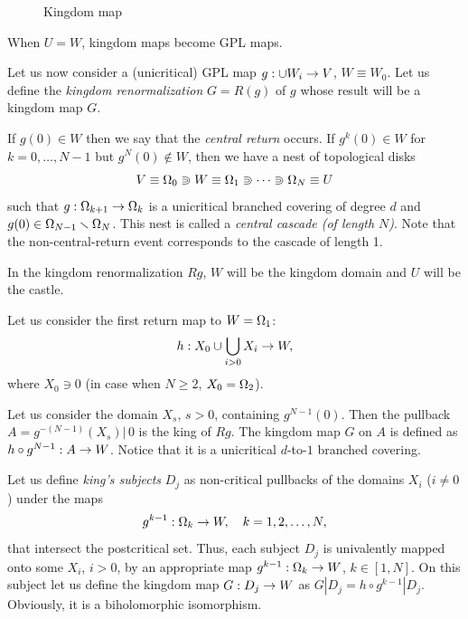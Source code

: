 \begin{figure}[htbp]
\begin{center}

\caption{Kingdom map}
\end{center}
\end{figure}



When $U=W$, kingdom maps become GPL maps.

\msk
Let us now consider a (unicritical)  GPL map $g: \cup W_i\rightarrow V$, $W\equiv W_0$. 
Let us define  the {\it kingdom renormalization} $G=R(g)$ of $g$
whose result will be a kingdom map $G$. 

 
 If $g(0)\in W$ then we say that the {\it central return} occurs.
If $g^k (0)\in W$ for $k=0, \dots, N-1$ but $g^N(0)\not\in W$, 
then we have a nest of topological disks
\begin{equation}\label{cascade}
    V\equiv {\Omega}_0\Supset W\equiv  {\Omega}_1\Supset\dots \Supset {\Omega}_N\equiv U
\end{equation}
such that $g: {\Omega}_{k+1}\rightarrow {\Omega}_k$ is a unicritical branched covering of degree $d$ 
and $g(0)\in {\Omega}_{N-1}\smallsetminus {\Omega}_N$.   
This nest is called a {\it central cascade (of length $N$)}. 
Note that the non-central-return event corresponds to the cascade of length 1. 

In  the kingdom renormalization $Rg$,  $W$ will be the kingdom domain and $U$ will be the  castle.

Let us consider the first return map to $W={\Omega}_1$:
$$
   h : X_0 \cup \bigcup_{i>0} X_i  \rightarrow W, 
$$
where $X_0\ni 0$ (in case when $N\geq 2$, $X_0= {\Omega}_2$). 

Let us consider the domain $X_s$, $s>0$,  containing  $g^{N-1}(0)$. 
Then  the pullback $A  = g^{-(N-1)}(X_s)|\, 0$ is the  king of $Rg$.  
The kingdom map $G$ on $A$ is defined as $ h \circ g^{N-1}: A \rightarrow W$.
Notice that it is a unicritical $d$-to-$1$ branched covering. 

Let us define {\it king's subjects} $D_j$ as non-critical pullbacks of the domains $X_i$ ($i\not= 0$) under the maps 
$$
   g^{k-1}: {\Omega}_k\rightarrow W,\quad k=1,2,\dots, N,
$$
that intersect the postcritical set. 
Thus,  each subject $D_j$ is  univalently mapped  onto some $X_i$, $i>0$,
by an appropriate map $g^{k-1}: {\Omega}_k \rightarrow W$, $k\in [1,N]$.
On this subject let us define the kingdom  map $G: D_j\rightarrow W$ as $G|D_j = h\circ g^{k-1}|D_j $.
Obviously, it is a biholomorphic isomorphism. 

